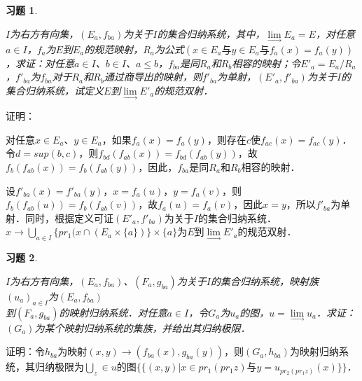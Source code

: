 \documentclass[12pt, a4paper, oneside]{book}
\newtheorem{exer}{习题}
\begin{document}
			\begin{exer}\label{exer195}
				\hfill\par
				$I$为右方有向集，$(E_a, f_{ba})$为关于$I$的集合归纳系统，其中，$\lim\limits_\to E_a=E$，对任意$a\in I$，$f_a$为$E$到$E_a$的规范映射，$R_a$为公式$(x\in E_a\text{与}y\in E_a\text{与}f_a(x)=f_a(y))$，求证：对任意$a\in I$、$b\in I$、$a\leq b$，$f_{ba}$是同$R_a$和$R_b$相容的映射；令${E'}_a=E_a/R_a$，${f'}_{ba}$为$f_{ba}$对于$R_a$和$R_b$通过商导出的映射，则${f'}_{ba}$为单射，$({E'}_a, {f'}_{ba})$为关于$I$的集合归纳系统，试定义$E$到$\lim\limits_\to {E'}_a$的规范双射．
			\end{exer}
			证明：
			\par
			对任意$x\in E_a$、$y\in E_a$，如果$f_a(x)= f_a(y)$，则存在$c$使$f_{ac}(x)=f_{ac}(y)$．令$d=sup(b, c)$，则$f_{bd}(f_{ab}(x))=f_{bd}(f_{ab}(y))$，故$f_b(f_{ab}(x))=f_b(f_{ab}(y))$，因此，$f_{ba}$是同$R_a$和$R_b$相容的映射．
			\par
			设${f'}_{ba}(x)={f'}_{ba}(y)$，$x=f_a(u)$，$y=f_a(v)$，则$f_b(f_{ab}(u))= f_b(f_{ab}(v))$，故$f_a(u)=f_a(v)$，因此$x=y$，所以${f'}_{ba}$为单射．同时，根据定义可证$({E'}_a, {f'}_{ba})$为关于$I$的集合归纳系统．$x\to \bigcup\limits_{a\in I}\{pr_1(x\cap(E_a\times \{a\})\}\times \{a\}$为$E$到$\lim\limits_\to {E'}_a$的规范双射．			
			
			\begin{exer}\label{exer196}
				\hfill\par
				$I$为右方有向集，$(E_a, f_{ba})$、$(F_a, g_{ba})$为关于$I$的集合归纳系统，映射族$(u_a)_{a\in I}$为$(E_a, f_{ba})$\\到$(F_a, g_{ba})$的映射归纳系统．对任意$a\in I$，令$G_a$为$u_a$的图，$u=\lim\limits_\to u_a$．求证：$(G_a)$为某个映射归纳系统的集族，并给出其归纳极限．
			\end{exer}
			证明：令$h_{ba}$为映射$(x, y)\to (f_{ba}(x), g_{ba}(y))$，则$(G_a, h_{ba})$为映射归纳系统，其归纳极限为$\bigcup\limits_z\in u\text{的图}\{\{(x, y)|x\in pr_1(pr_1z)\text{与}y=u_{pr_2(pr_1z)}(x)\}\}$．
					
\end{document}
